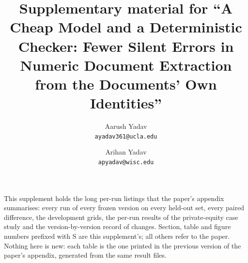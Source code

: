 \documentclass[10pt]{article}
\title{\Large\bfseries Supplementary material for ``A Cheap Model and a Deterministic Checker: Fewer Silent Errors in Numeric Document Extraction from the Documents' Own Identities''}
\author{Aarush Yadav\\\texttt{ayadav361@ucla.edu}\and Arihan Yadav\\\texttt{apyadav@wisc.edu}}
\date{}
\begin{document}
\maketitle
\small
\setlength{\tabcolsep}{5pt}
\noindent This supplement holds the long per-run listings that the paper's appendix summarises: every run of every frozen version on every held-out set, every paired difference, the development grids, the per-run results of the private-equity case study and the version-by-version record of changes. Section, table and figure numbers prefixed with S are this supplement's; all others refer to the paper. Nothing here is new: each table is the one printed in the previous version of the paper's appendix, generated from the same result files.


\end{document}
